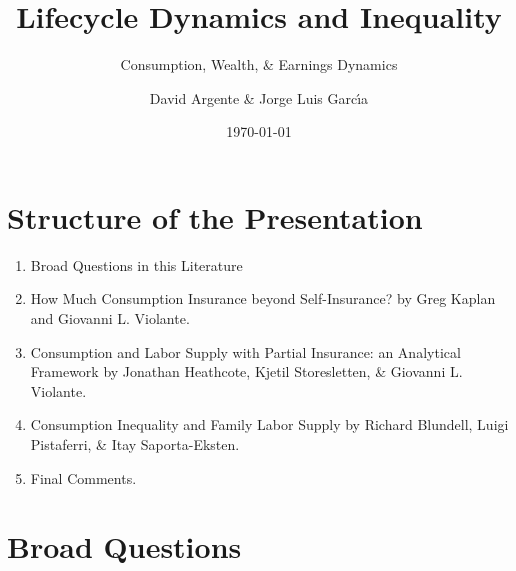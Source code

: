\documentclass[notes=show]{beamer}
\begin{document}
\title[Consumption, Wealth, \& Earnings Dynamics]{Lifecycle Dynamics and
Inequality}
\subtitle{Consumption, Wealth, \& Earnings Dynamics}
\author[Argente \& Garc\'{\i}a]{David Argente \& Jorge Luis Garc\'{\i}a}
\date{\today }
\maketitle

\section{Structure of the Presentation}

\begin{frame}%


\begin{enumerate}
\item Broad Questions in this Literature

\item How Much Consumption Insurance beyond Self-Insurance? by Greg Kaplan
and Giovanni L. Violante.

\item Consumption and Labor Supply with Partial Insurance: an Analytical
Framework by Jonathan Heathcote, Kjetil Storesletten, \& Giovanni L.
Violante.

\item Consumption Inequality and Family Labor Supply by Richard Blundell,
Luigi Pistaferri, \& Itay Saporta-Eksten.

\item Final Comments.
\end{enumerate}

\transboxout%
\end{frame}%

\bigskip

\section{Broad Questions}
\end{document}
